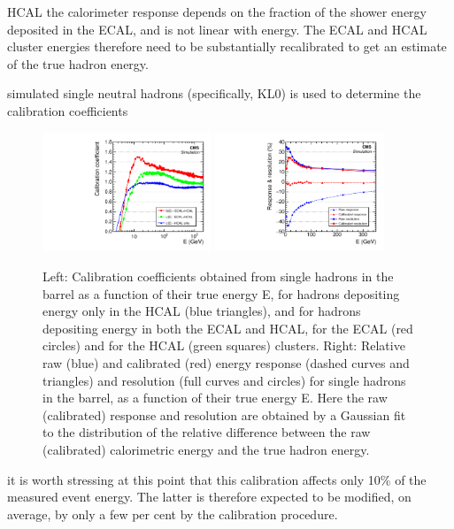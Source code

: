 HCAL
the calorimeter response depends on the fraction of the shower energy deposited in the ECAL, and is not linear with energy. The ECAL and HCAL cluster energies therefore need to be substantially recalibrated to get an estimate of the true hadron energy.

simulated single neutral hadrons (specifically, KL0) is used to determine the calibration coefficients


\begin{figure}[htbp]
\centering
     \includegraphics[width=0.45\textwidth]{object_reconstruction_and_selection/plots/calo_calibrations.pdf}
     \includegraphics[width=0.45\textwidth]{object_reconstruction_and_selection/plots/calo_response_and_res.pdf}
     \caption{
Left: Calibration coefficients obtained from single hadrons in the barrel as a function of their true energy E, for hadrons depositing energy only in the HCAL (blue triangles), and for hadrons depositing energy in both the ECAL and HCAL, for the ECAL (red circles) and for the HCAL (green squares) clusters. Right: Relative raw (blue) and calibrated (red) energy response (dashed curves and triangles) and resolution (full curves and circles) for single hadrons in the barrel, as a function of their true energy E. Here the raw (calibrated) response and resolution are obtained by a Gaussian fit to the distribution of the relative difference between the raw (calibrated) calorimetric energy and the true hadron energy.
     }
     \label{fig:cms_slice}
\end{figure}

it is worth stressing at this point that this calibration affects only 10\% of the measured event energy. The latter is therefore expected to be modified, on average, by
only a few per cent by the calibration procedure.


